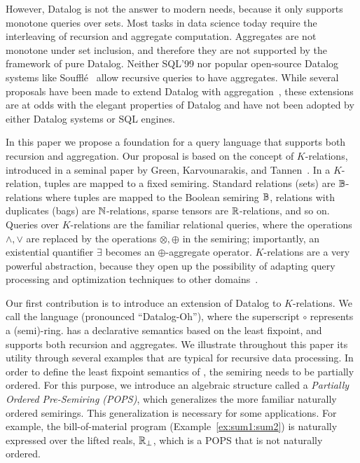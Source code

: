 However, Datalog is not the answer to modern needs, because it only
supports monotone queries over sets.  Most tasks in data science today
require the interleaving of recursion and aggregate computation.
Aggregates are not monotone under set inclusion, and therefore they
are not supported by the framework of pure Datalog.  Neither SQL'99
nor popular open-source Datalog systems like
Souffl\'e~\cite{DBLP:conf/cav/JordanSS16} allow recursive queries to
have aggregates.  While several proposals have been made to extend
Datalog with
aggregation~\cite{DBLP:conf/pods/GangulyGZ91,DBLP:conf/pods/RossS92,DBLP:journals/jcss/GangulyGZ95,DBLP:journals/vldb/MazuranSZ13,DBLP:conf/icde/ShkapskyYZ15,DBLP:conf/sigmod/ShkapskyYICCZ16,DBLP:conf/amw/ZanioloYDI16,DBLP:journals/tplp/ZanioloYDSCI17,DBLP:conf/amw/ZanioloYIDSC18,DBLP:journals/tplp/CondieDISYZ18,DBLP:conf/sigmod/0001WMSYDZ19,DBLP:journals/corr/abs-1910-08888,DBLP:journals/corr/abs-1909-08249,DBLP:journals/debu/ZanioloD0LL021},
these extensions are at odds with the elegant properties of Datalog
and have not been adopted by either Datalog systems or SQL engines.

In this paper we propose a foundation for a query language that
supports both recursion and aggregation.  Our proposal is based on the
concept of $K$-relations, introduced in a seminal
paper by Green, Karvounarakis, and Tannen~\cite{DBLP:conf/pods/GreenKT07}.
In a $K$-relation, tuples are
mapped to a fixed semiring. Standard relations (sets) are
$\mathbb B$-relations where tuples are mapped to the Boolean semiring $\mathbb B$,
relations with duplicates (bags) are $\mathbb N$-relations, sparse tensors
are $\mathbb R$-relations, and so on.  Queries over $K$-relations are the
familiar relational queries, where the operations $\wedge, \vee$ are
replaced by the operations $\otimes, \oplus$ in the semiring;
importantly, an existential quantifier $\exists$ becomes an
$\oplus$-aggregate operator.
$K$-relations are a very powerful abstraction, because they open up
the possibility of adapting query processing and optimization
techniques to other domains~\cite{DBLP:conf/pods/KhamisNR16}.

Our first contribution is to introduce an extension of Datalog to
$K$-relations.  We call the language \datalogo 
 (pronounced ``Datalog-Oh''),
 where the superscript
$\circ$ represents a (semi)-ring. \datalogo has a declarative semantics
based on the least fixpoint, and supports both recursion and
aggregates.  We illustrate throughout this paper its utility through
several examples that are typical for recursive data processing.  In
order to define the least fixpoint semantics of \datalogo, the semiring
needs to be partially ordered.  For this purpose, we introduce an
algebraic structure called a {\em Partially Ordered Pre-Semiring (POPS)\/},
which generalizes the more familiar naturally ordered semirings.  This
generalization is necessary for some applications.  For example, the
bill-of-material program (Example~\ref{ex:sum1:sum2}) is naturally
expressed over the lifted reals, $\mathbb R_\bot$, which is a POPS that is
not naturally ordered.

